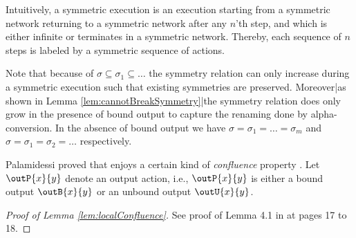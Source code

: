\documentclass[11pt,techReport]{eptcs}
\begin{document}
Intuitively, a symmetric execution is an execution starting from a symmetric network returning to a symmetric network after any $ n $'th step, and which is either infinite or terminates in a symmetric network. Thereby, each sequence of $ n $ steps is labeled by a symmetric sequence of actions. 


\noindent
Note that because of $ \sigma \subseteq \sigma_1 \subseteq \ldots $ the symmetry relation can only increase during a symmetric execution such that existing symmetries are preserved. Moreover|as shown in Lemma \ref{lem:cannotBreakSymmetry}|the symmetry relation does only grow in the presence of bound output to capture the renaming done by alpha-conversion. In the absence of bound output we have $ \sigma = \sigma_1 = \ldots = \sigma_m $ and $ \sigma = \sigma_1 = \sigma_2 = \ldots $ respectively.

Palamidessi proved that \pisep enjoys a certain kind of \textit{confluence} property \cite{palamidessi03}. Let $ \outP{x}{y} $ denote an output action, i.e., $ \outP{x}{y} $ is either a bound output $ \outB{x}{y} $ or an unbound output $ \outU{x}{y} $.
\begin{proof}[Proof of Lemma \ref{lem:localConfluence}]
	See proof of Lemma 4.1 in \cite{palamidessi03} at pages 17 to 18.
\end{proof}
\end{document}
